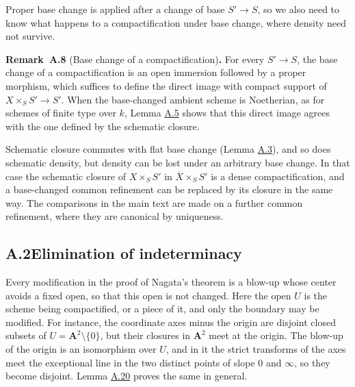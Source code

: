 \documentclass[11pt]{article}
\newenvironment{bpstatement}[2]{\par\addvspace{0.6\baselineskip}\noindent\textbf{#1}#2\textbf{.}\enspace\ignorespaces}
  {\par\addvspace{0.4\baselineskip}}
\begin{document}
\label{bp21}%
Proper base change is applied after a change of base \(S'\to S\), so we also need to know what happens to a compactification under base change, where density need not survive.

\label{bp22}%
\begin{bpstatement}{Remark~A.8}{ (Base change of a compactification)}
For every \(S'\to S\), the base change of a compactification is an open immersion followed by a proper morphism, which suffices to define the direct image with compact support of \(X\times_SS'\to S'\). When the base-changed ambient scheme is Noetherian, as for schemes of finite type over \(k\), Lemma \hyperref[bp15]{A.5} shows that this direct image agrees with the one defined by the schematic closure.

Schematic closure commutes with flat base change (Lemma \hyperref[bp9]{A.3}), and so does schematic density, but density can be lost under an arbitrary base change. In that case the schematic closure of \(X\times_SS'\) in \(\overline X\times_SS'\) is a dense compactification, and a base-changed common refinement can be replaced by its closure in the same way. The comparisons in the main text are made on a further common refinement, where they are canonical by uniqueness.
\end{bpstatement}


\subsection*{\texorpdfstring{A.2\quad Elimination of indeterminacy}{A.2 Elimination of indeterminacy}}
\label{bp23}%
\label{bp24}%
Every modification in the proof of Nagata's theorem is a blow-up whose center avoids a fixed open, so that this open is not changed. Here the open \(U\) is the scheme being compactified, or a piece of it, and only the boundary may be modified. For instance, the coordinate axes minus the origin are disjoint closed subsets of \(U=\mathbf A^2\setminus\{0\}\), but their closures in \(\mathbf A^2\) meet at the origin. The blow-up of the origin is an isomorphism over \(U\), and in it the strict transforms of the axes meet the exceptional line in the two distinct points of slope \(0\) and \(\infty\), so they become disjoint. Lemma \hyperref[bp53]{A.20} proves the same in general.
\end{document}
